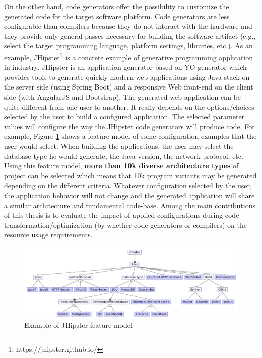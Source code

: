 On the other hand, code generators offer the possibility to customize the generated code for the target software platform. Code generators are less configurable than compilers because they do not interact with the hardware and they provide only general passes necessary for building the software artifact (e.g., select the target programming language, platform settings, libraries, etc.).
As an example, JHipster\footnote{https://jhipster.github.io/} is a concrete example of generative programming application in industry. JHipster is an application generator based on YO generator which provides tools to generate quickly modern web applications using Java stack on the server side (using Spring Boot) and a responsive Web front-end on the client side (with AngularJS and Bootstrap).
The generated web application can be quite different from one user to another. It really depends on the options/choices selected by the user to build a configured application. The selected parameter values will configure the way the JHipster code generators will produce code. 
For example, Figure \ref{fig:jhipster} shows a feature model of some configuration examples that the user would select. When building the applications, the user may select the database type he would generate, the Java version, the network protocol, etc. 
Using this feature model, \textbf{more than 10k diverse architecture types} of project can be selected which means that 10k program variants may be generated depending on the different criteria.
Whatever configuration selected by the user, the application behavior will not change and the generated application will share a similar architecture and fundamental code-base.
Among the main contributions of this thesis is to evaluate the impact of applied configurations during code transformation/optimization (by whether code generators or compilers) on the resource usage requirements.
\begin{figure}[h]
	\center
	\includegraphics[scale=0.65]{Background/fig/jhipster}
	\caption{Example of JHipster feature model}
	\label{fig:jhipster}
\end{figure}

